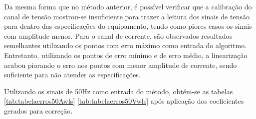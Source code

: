 \begin{table}[H]
\end{table}

Da mesma forma que no método anterior, é possível verificar que a calibração do canal de tensão mostrou-se insuficiente para trazer a leitura dos sinais de tensão para dentro das especificações do equipamento, tendo como piores casos os sinais com amplitude menor. Para o canal de corrente, são observados resultados semelhantes utilizando os pontos com erro máximo como entrada do algoritmo. Entretanto, utilizando os pontos de erro mínimo e de erro médio, a linearização acabou piorando o erro nos pontos com menor amplitude de corrente, sendo suficiente para não atender as especificações.

Utilizando os sinais de 50Hz como entrada do método, obtém-se as tabelas \ref{tab:tabelaerros50Awls} \ref{tab:tabelaerros50Vwls} após aplicação dos coeficientes gerados para correção.

